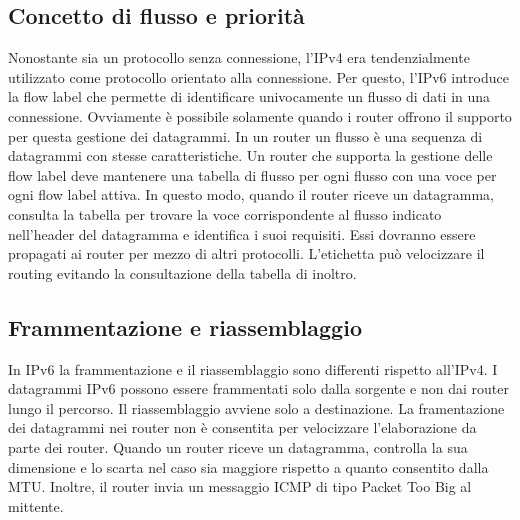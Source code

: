 \documentclass[12pt]{report}
\begin{document}
\subsection{Concetto di flusso e priorità}
Nonostante sia un protocollo senza connessione, l'IPv4 era tendenzialmente utilizzato come protocollo orientato alla connessione. Per questo, l'IPv6 introduce la flow label che permette di identificare univocamente un flusso di dati in una connessione. Ovviamente è possibile solamente quando i router offrono il supporto per questa gestione dei datagrammi. In un router un flusso è una sequenza di datagrammi con stesse caratteristiche. Un router che supporta la gestione delle flow label deve mantenere una tabella di flusso per ogni flusso con una voce per ogni flow label attiva. In questo modo, quando il router riceve un datagramma, consulta la tabella per trovare la voce corrispondente al flusso indicato nell'header del datagramma e identifica i suoi requisiti. Essi dovranno essere propagati ai router per mezzo di altri protocolli. L'etichetta può velocizzare il routing evitando la consultazione della tabella di inoltro.

\subsection{Frammentazione e riassemblaggio}
In IPv6 la frammentazione e il riassemblaggio sono differenti rispetto all'IPv4. I datagrammi IPv6 possono essere frammentati solo dalla sorgente e non dai router lungo il percorso. Il riassemblaggio avviene solo a destinazione. La framentazione dei datagrammi nei router non è consentita per velocizzare l'elaborazione da parte dei router. Quando un router riceve un datagramma, controlla la sua dimensione e lo scarta nel caso sia maggiore rispetto a quanto consentito dalla MTU. Inoltre, il router invia un messaggio ICMP di tipo Packet Too Big al mittente.
\end{document}
